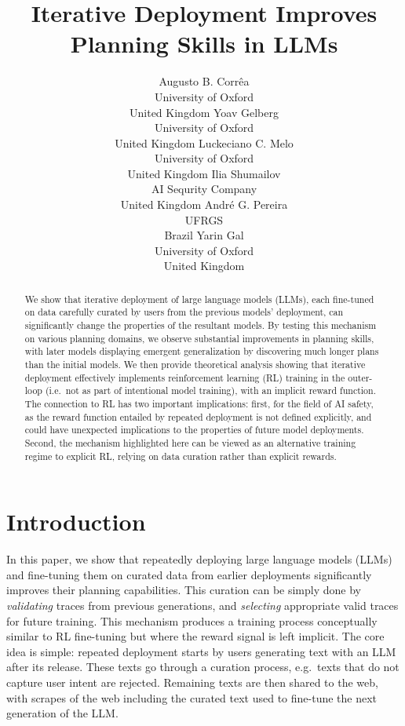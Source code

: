 \documentclass{article}
\title{Iterative Deployment Improves\\Planning Skills in LLMs}
\author{Augusto B. Corr\^{e}a\\
University of Oxford\\
United Kingdom
 \And
Yoav Gelberg\\
University of Oxford\\
United Kingdom
\And
Luckeciano C. Melo\\
University of Oxford\\
United Kingdom
\AND
Ilia Shumailov\\
AI Sequrity Company\\
United Kingdom
\And
Andr\'{e} G. Pereira\\
UFRGS\\
Brazil
 \And
Yarin Gal\\
University of Oxford\\
United Kingdom}
\begin{document}
\maketitle

\begin{abstract}

We show that iterative deployment of large language models (LLMs), each fine-tuned on data carefully curated by users from the previous models' deployment, can significantly change the properties of the resultant models.
By testing this mechanism on various planning domains, we observe substantial improvements in planning skills, with later models displaying emergent generalization by discovering much longer plans than the initial models.
We then provide theoretical analysis showing that iterative deployment effectively implements reinforcement learning (RL) training in the outer-loop (i.e.\ not as part of intentional model training), with an implicit reward function.
The connection to RL has two important implications: first, for the field of AI safety, as the reward function entailed by repeated deployment is not defined explicitly, and could have unexpected implications to the properties of future model deployments. Second, the mechanism highlighted here can
be viewed as an alternative training regime to explicit RL, relying on data curation rather than explicit rewards.
\end{abstract}


\section{Introduction}

In this paper, we show that repeatedly deploying large language models (LLMs)
and fine-tuning them on curated data from earlier deployments significantly
improves their planning capabilities.  This curation can be simply done by
\emph{validating} traces from previous generations, and \emph{selecting}
appropriate valid traces for future training. This mechanism produces a training
process conceptually similar to RL fine-tuning but where the reward signal is
left implicit.
The core idea is simple:
repeated deployment starts by users generating text with an LLM after its release. These texts go through a curation process, e.g.\ texts that do not capture user intent are rejected. Remaining texts are then shared to the web, with scrapes of the web including the curated text used to fine-tune the next generation of the LLM.
\end{document}

